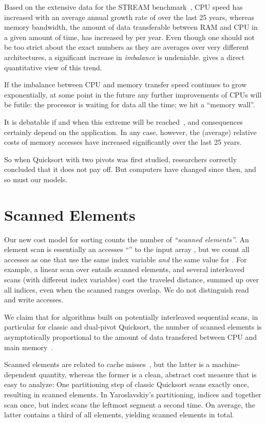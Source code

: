 \documentclass[]{theotage}
\begin{document}
Based on the extensive data for the STREAM benchmark~\cite{McCalpin1995,McCalpin2007},
CPU speed has increased with an average annual growth rate of  over the last 25 years, 
whereas memory bandwidth,
the amount of data transferable between RAM and CPU in a given amount of time, 
has increased by  per year.
Even though one should not be too strict about the exact numbers as they are averages over
very different architectures, a significant increase in \emph{imbalance} is undeniable.
 gives a direct quantitative view of this trend.

If the imbalance between CPU and memory transfer speed continues to grow exponentially,
at some point in the future any further improvements of CPUs will be futile: 
the processor is waiting for data all the time;
we hit a ``memory wall''.

It is debatable if and when this extreme will be reached~\cite{Ertl2001,McKee2004},
and consequences certainly depend on the application.
In any case, however, the (average) relative costs of memory accesses
have increased significantly over the last 25 years.

So when Quicksort with two pivots was first studied, 
researchers correctly concluded that it does not pay off.
But computers have changed since then, and so must our models.


\section{Scanned Elements}
\label{sec:scanned-elements}

Our new cost model for sorting counts the number of \emph{``scanned elements''}.
An element scan is essentially an accesses ``'' to the input array , 
but we count all accesses as one that
use the same index variable  \emph{and} the same value for .
For example, a linear scan over  entails  scanned elements, 
and several interleaved scans 
(with different index variables) cost the traveled distance, 
summed up over all indices, even when the scanned ranges overlap.
We do not distinguish read and write accesses.

We claim that for algorithms built on potentially interleaved sequential scans, 
in particular for classic and dual-pivot Quicksort,
the number of scanned elements is asymptotically proportional 
to the amount of data transfered between CPU and main memory~\cite{MartinezNebelWild2015aofaFullPaper}.

Scanned elements are related to cache misses~\cite{Kushagra2014}, 
but the latter is a machine-dependent quantity, 
whereas the former is a clean, abstract cost measure that is easy to analyze:
One partitioning step of classic Quicksort scans  exactly once, resulting in  scanned
elements.
In Yaroslavskiy's partitioning, indices  and  together scan  once, but index  
scans the leftmost segment a second time.
On average, the latter contains a third of all elements, yielding  
scanned elements in total.
\end{document}
